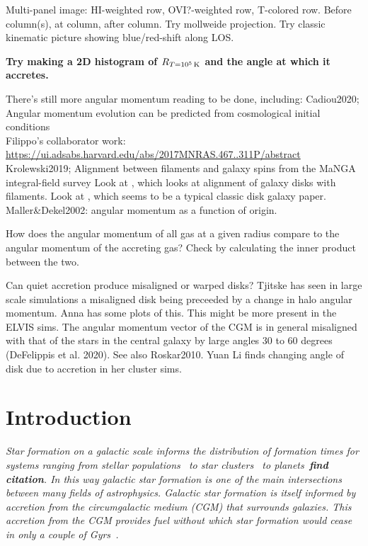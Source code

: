 \documentclass[fleqn,usenatbib]{mnras}
\newcommand{\Rcon}{R_{T=10^5\,{\rm K}}}
\begin{document}
Multi-panel image:
HI-weighted row,
OVI?-weighted row,
T-colored row.
Before column(s), at column, after column.
Try mollweide projection.
Try classic kinematic picture showing blue/red-shift along LOS.

\textbf{
Try making a 2D histogram of $\Rcon$ and the angle at which it accretes.
}

There's still more angular momentum reading to be done, including:
Cadiou2020; Angular momentum evolution can be predicted from cosmological initial conditions\\
Filippo's collaborator work: \url{https://ui.adsabs.harvard.edu/abs/2017MNRAS.467..311P/abstract}\\
Krolewski2019; Alignment between filaments and galaxy spins from the {MaNGA} integral-field survey
Look at \cite{Bird2019}, which looks at alignment of galaxy disks with filaments.
Look at \cite{Bird2020}, which seems to be a typical classic disk galaxy paper.
Maller\&Dekel2002: angular momentum as a function of origin.

How does the angular momentum of all gas at a given radius compare to the angular momentum of the accreting gas?
Check by calculating the inner product between the two.

Can quiet accretion produce misaligned or warped disks?
Tjitske has seen in large scale simulations a misaligned disk being preceeded by a change in halo angular momentum.
Anna has some plots of this. This might be more present in the ELVIS sims.
The angular momentum vector of the CGM is in general misaligned with that of the stars in the central galaxy by large angles  30 to 60 degrees (DeFelippis et al. 2020).
See also Roskar2010.
Yuan Li finds changing angle of disk due to accretion in her cluster sims.

\section{Introduction}
\label{s: introduction}

\textit{
Star formation on a galactic scale informs the distribution of formation times for systems ranging from stellar populations~\cite{Yu2021} to star clusters~\citep[e.g.][]{Grudic2020} to planets~\textbf{find citation}.
In this way galactic star formation is one of the main intersections between many fields of astrophysics.
Galactic star formation is itself informed by accretion from the circumgalactic medium (CGM) that surrounds galaxies.
This accretion from the CGM provides fuel without which star formation would cease in only a couple of Gyrs~\cite[e.g.][]{Prochaska2009, Bauermeister2010, Spring2017}.
}
\end{document}
